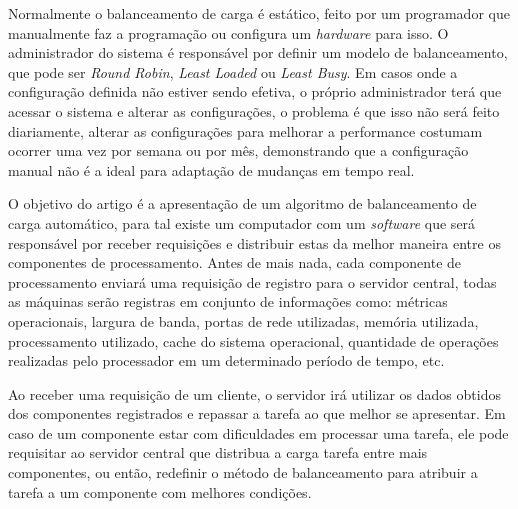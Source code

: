 	Normalmente o balanceamento de carga é estático, feito por um programador que manualmente faz a programação ou configura um \textit{hardware} para isso. O administrador do sistema é responsável por definir um modelo de balanceamento, que pode ser \textit{Round Robin}, \textit{Least Loaded} ou \textit{Least Busy}. Em casos onde a configuração definida não estiver sendo efetiva, o próprio administrador terá que acessar o sistema e alterar as configurações, o problema é que isso não será feito diariamente, alterar as configurações para melhorar a performance costumam ocorrer uma vez por semana ou por mês, demonstrando que a configuração manual não é a ideal para adaptação de mudanças em tempo real.
	
	O objetivo do artigo é a apresentação de um algoritmo de balanceamento de carga automático, para tal existe um computador com um \textit{software} que será responsável por receber requisições e distribuir estas da melhor maneira entre os componentes de processamento. Antes de mais nada, cada componente de processamento enviará uma requisição de registro para o servidor central, todas as máquinas serão registras em conjunto de informações como: métricas operacionais, largura de banda, portas de rede utilizadas, memória utilizada, processamento utilizado, cache do sistema operacional, quantidade de operações realizadas pelo processador em um determinado período de tempo, etc.
	
	Ao receber uma requisição de um cliente, o servidor irá utilizar os dados obtidos dos componentes registrados e repassar a tarefa ao que melhor se apresentar. Em caso de um componente estar com dificuldades em processar uma tarefa, ele pode requisitar ao servidor central que distribua a carga tarefa entre mais componentes, ou então, redefinir o método de balanceamento para atribuir a tarefa a um componente com melhores condições.
	
	
	

